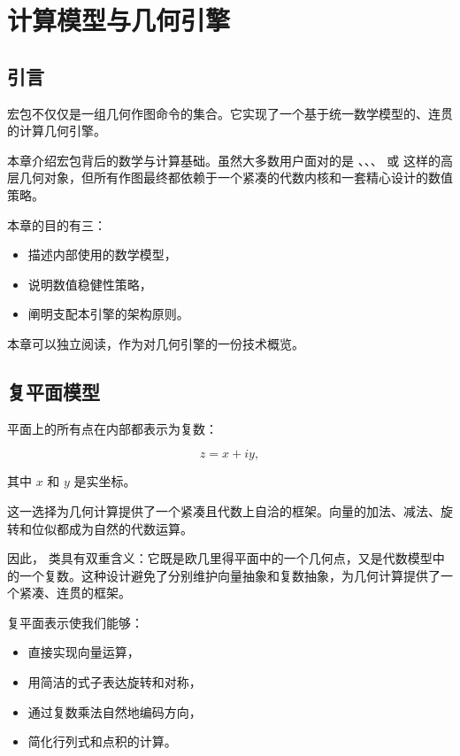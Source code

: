 \section{计算模型与几何引擎}
\subsection{引言}

 宏包不仅仅是一组几何作图命令的集合。它实现了一个基于统一数学模型的、连贯的计算几何引擎。

本章介绍宏包背后的数学与计算基础。虽然大多数用户面对的是 、、、 或  这样的高层几何对象，但所有作图最终都依赖于一个紧凑的代数内核和一套精心设计的数值策略。

本章的目的有三：

\begin{itemize}
\item 描述内部使用的数学模型，
\item 说明数值稳健性策略，
\item 阐明支配本引擎的架构原则。
\end{itemize}

本章可以独立阅读，作为对几何引擎的一份技术概览。

\subsection{复平面模型}

平面上的所有点在内部都表示为复数：

\[
z = x + iy,
\]

其中 \(x\) 和 \(y\) 是实坐标。

这一选择为几何计算提供了一个紧凑且代数上自洽的框架。向量的加法、减法、旋转和位似都成为自然的代数运算。

因此， 类具有双重含义：它既是欧几里得平面中的一个几何点，又是代数模型中的一个复数。这种设计避免了分别维护向量抽象和复数抽象，为几何计算提供了一个紧凑、连贯的框架。

复平面表示使我们能够：

\begin{itemize}
\item 直接实现向量运算，
\item 用简洁的式子表达旋转和对称，
\item 通过复数乘法自然地编码方向，
\item 简化行列式和点积的计算。
\end{itemize}

